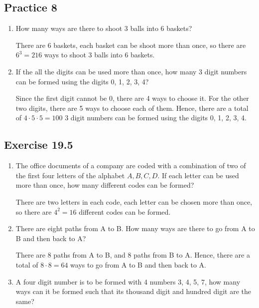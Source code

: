 \documentclass{report}
\begin{document}
\begin{multicols}{2}
  \subsection{Practice 8}

  \begin{enumerate}
    \item How many ways are there to shoot 3 balls into 6 baskets? \sol{}

          There are 6 baskets, each basket can be shoot more than once, so there are $6^3
            = 216$ ways to shoot 3 balls into 6 baskets.

    \item If the all the digits can be used more than once, how many 3 digit numbers can
          be formed using the digits 0, 1, 2, 3, 4? \sol{}

          Since the first digit cannot be 0, there are 4 ways to choose it. For the other
          two digits, there are 5 ways to choose each of them. Hence, there are a total
          of $4 \cdot 5 \cdot 5 = 100$ 3 digit numbers can be formed using the digits 0,
          1, 2, 3, 4.
  \end{enumerate}

  \subsection{Exercise 19.5}

  \begin{enumerate}
    \item The office documents of a company are coded with a combination of two of the
          first four letters of the alphabet $A, B, C, D$. If each letter can be used
          more than once, how many different codes can be formed? \sol{}

          There are two letters in each code, each letter can be chosen more than once,
          so there are $4^2 = 16$ different codes can be formed.

    \item There are eight paths from A to B. How many ways are there to go from A to B
          and then back to A? \sol{}

          There are 8 paths from A to B, and 8 paths from B to A. Hence, there are a
          total of $8 \cdot 8 = 64$ ways to go from A to B and then back to A.

    \item A four digit number is to be formed with 4 numbers 3, 4, 5, 7, how many ways
          can it be formed such that its thousand digit and hundred digit are the same?
          \sol{}


\end{enumerate}
\end{multicols}
\end{document}
